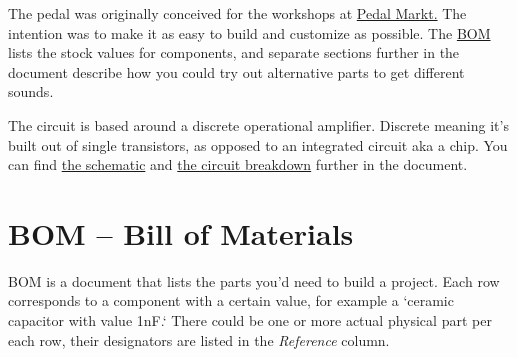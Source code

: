 \documentclass[a4paper,12pt]{article}
\begin{document}
The pedal was originally conceived for the workshops at
\href{https://pedalmarkt.com}{Pedal Markt.} The intention
was  to make it as easy to build and customize as possible.
The \hyperref[sec:bom]{BOM} lists the stock values for
components, and separate sections further in the document
describe how you could try out alternative parts to get
different sounds.

The circuit is based around a discrete operational
amplifier. Discrete meaning it's built out of single
transistors, as opposed to an integrated circuit aka a chip.
You can find \hyperref[sec:schematic]{the schematic} and
\hyperref[sec:circuit]{the circuit breakdown} further in the
document.

\pagebreak

\section{BOM – Bill of Materials}
\label{sec:bom}

BOM is a document that lists the parts you'd need to build a
project. Each row corresponds to a component with a certain
value, for example a `ceramic capacitor with value 1nF.`
There could be one or more actual physical part per each
row, their designators are listed in the \textit{Reference}
column.




\end{document}
